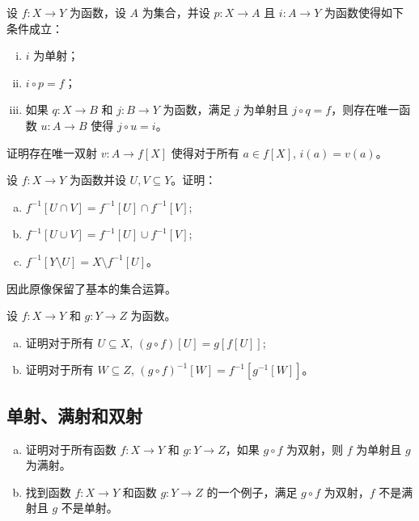 \begin{chapex}
设 $f : X \to Y$ 为函数，设 $A$ 为集合，并设 $p : X \to A$ 且 $i : A \to Y$ 为函数使得如下条件成立：
\begin{enumerate}[(i)]
\item $i$ 为单射；
\item $i \circ p = f$；
\item 如果 $q : X \to B$ 和 $j : B \to Y$ 为函数，满足 $j$ 为单射且 $j \circ q = f$，则存在唯一函数 $u : A \to B$ 使得 $j \circ u = i$。
\end{enumerate}
证明存在唯一双射 $v : A \to f[X]$ 使得对于所有 $a \in f[X]$, $i(a)=v(a)$。
\end{chapex}

\begin{chapex}
设 $f : X \to Y$ 为函数并设 $U, V \subseteq Y$。证明：
\begin{enumerate}[(a)]
\item $f^{-1}[U \cap V] = f^{-1}[U] \cap f^{-1}[V]$;
\item $f^{-1}[U \cup V] = f^{-1}[U] \cup f^{-1}[V]$; 
\item $f^{-1}[Y \setminus U] = X \setminus f^{-1}[U]$。
\end{enumerate}
因此原像保留了基本的集合运算。
\end{chapex}

\begin{chapex}
设 $f : X \to Y$ 和 $g : Y \to Z$ 为函数。
\begin{enumerate}[(a)]
\item 证明对于所有 $U \subseteq X$, $(g \circ f)[U] = g[f[U]]$;
\item 证明对于所有 $W \subseteq Z$, $(g \circ f)^{-1}[W] = f^{-1}[g^{-1}[W]]$。
\end{enumerate}
\end{chapex}

\subsection*{单射、满射和双射}

\begin{chapex}
\begin{enumerate}[(a)]
\item 证明对于所有函数 $f : X \to Y$ 和 $g : Y \to Z$，如果 $g \circ f$ 为双射，则 $f$ 为单射且 $g$ 为满射。
\item 找到函数 $f : X \to Y$ 和函数 $g : Y \to Z$ 的一个例子，满足 $g \circ f$ 为双射，$f$ 不是满射且 $g$ 不是单射。
\end{enumerate}
\end{chapex}

